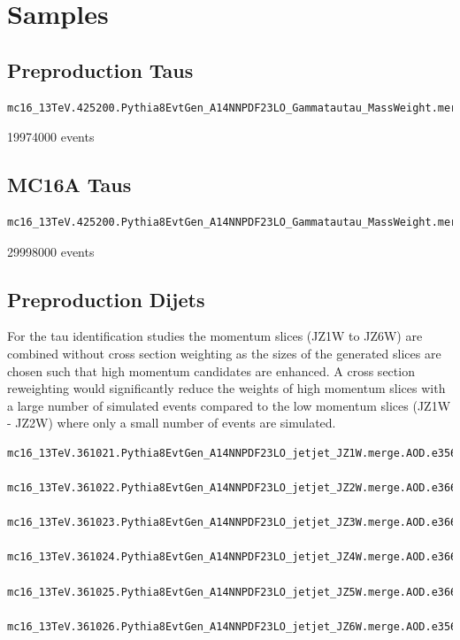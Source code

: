
\section{Samples}
\label{app:samples}

\subsection{Preproduction Taus}
\label{app:preprod_taus}

\begin{lstlisting}[basicstyle=\small\ttfamily, breaklines=true]
  mc16_13TeV.425200.Pythia8EvtGen_A14NNPDF23LO_Gammatautau_MassWeight.merge.AOD.e5468_s2997_r9064_r8996
\end{lstlisting}

19974000 events

\subsection{MC16A Taus}
\label{app:mc16a_taus}

\begin{lstlisting}[basicstyle=\small\ttfamily, breaklines=true]
  mc16_13TeV.425200.Pythia8EvtGen_A14NNPDF23LO_Gammatautau_MassWeight.merge.AOD.e5468_s3126_r9364_r9315
\end{lstlisting}

29998000 events

\subsection{Preproduction Dijets}
\label{app:preprod_dijets}
For the tau identification studies the momentum slices (JZ1W to JZ6W) are
combined without cross section weighting as the sizes of the generated slices
are chosen such that high momentum candidates are enhanced. A cross section
reweighting would significantly reduce the weights of high momentum slices with
a large number of simulated events compared to the low momentum slices (JZ1W -
JZ2W) where only a small number of events are simulated.

\begin{lstlisting}[basicstyle=\small\ttfamily, breaklines=true]
  mc16_13TeV.361021.Pythia8EvtGen_A14NNPDF23LO_jetjet_JZ1W.merge.AOD.e3569_s2997_r9064_r8996
  mc16_13TeV.361022.Pythia8EvtGen_A14NNPDF23LO_jetjet_JZ2W.merge.AOD.e3668_s2997_r9064_r9078
  mc16_13TeV.361023.Pythia8EvtGen_A14NNPDF23LO_jetjet_JZ3W.merge.AOD.e3668_s2997_r9064_r8996
  mc16_13TeV.361024.Pythia8EvtGen_A14NNPDF23LO_jetjet_JZ4W.merge.AOD.e3668_s2997_r9064_r9078
  mc16_13TeV.361025.Pythia8EvtGen_A14NNPDF23LO_jetjet_JZ5W.merge.AOD.e3668_s2997_r9064_r8996
  mc16_13TeV.361026.Pythia8EvtGen_A14NNPDF23LO_jetjet_JZ6W.merge.AOD.e3569_s2997_r9064_r9078
\end{lstlisting}

